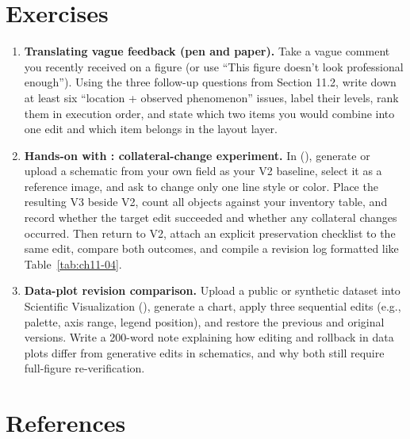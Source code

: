 \section{Exercises}

\begin{enumerate}
\item \textbf{Translating vague feedback (pen and paper).} Take a vague comment you recently received on a figure (or use ``This figure doesn't look professional enough''). Using the three follow-up questions from Section 11.2, write down at least six ``location + observed phenomenon'' issues, label their levels, rank them in execution order, and state which two items you would combine into one edit and which item belongs in the layout layer.
\item \textbf{Hands-on with \scidraw{}: collateral-change experiment.} In \scidraw{} (), generate or upload a schematic from your own field as your V2 baseline, select it as a reference image, and ask to change only one line style or color. Place the resulting V3 beside V2, count all objects against your inventory table, and record whether the target edit succeeded and whether any collateral changes occurred. Then return to V2, attach an explicit preservation checklist to the same edit, compare both outcomes, and compile a revision log formatted like Table~\ref{tab:ch11-04}.
\item \textbf{Data-plot revision comparison.} Upload a public or synthetic dataset into \scidraw{} Scientific Visualization (), generate a chart, apply three sequential edits (e.g., palette, axis range, legend position), and restore the previous and original versions. Write a 200-word note explaining how editing and rollback in data plots differ from generative edits in schematics, and why both still require full-figure re-verification.
\end{enumerate}

\section*{References}

